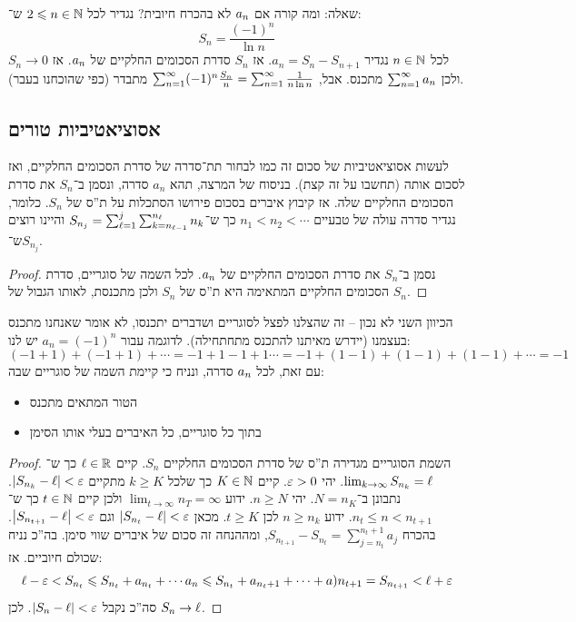 \documentclass[name=רשימות חשבון דיפרנציאלי ואינטגרלי 1א]{../../../tex/classes/megasumPreamble}
\begin{document}
	שאלה: ומה קורה אם $a_n$ לא בהכרח חיובית? נגדיר לכל $2 \leqslant n \in \mathbb{N}$ ש־:
	\[ S_n = \frac{(-1)^{n}}{\ln n} \]
	לכל $n \in \mathbb{N}$ נגדיר $a_n = S_n - S_{n + 1}$. אז $S_n$ סדרת הסכומים החלקיים של $a_n$. אז $S_n \to 0$ ולכן $\sum_{n = 1}^{\infty} a_n$ מתכנס. אבל, $\sum_{n = 1}^{\infty} (-1)^{n} \frac{S_n}{n} = \sum_{n = 1}^{\infty} \frac{1}{n \ln n}$ מתבדר (כפי שהוכחנו בעבר).
	
	\subsection{אסוציאטיביות טורים}
	לעשות אסוציאטיביות של סכום זה כמו לבחור תת־סדרה של סדרת הסכומים החלקיים, ואז לסכום אותה (תחשבו על זה קצת).
	בניסוח של המרצה, תהא $a_n$ סדרה, ונסמן ב־$S_n$ את סדרת הסכומים החלקיים שלה. אז קיבוץ איברים בסכום פירושו הסתכלות על ת''ס של $S_n$. כלומר, נגדיר סדרה עולה של טבעיים $n_1 < n_2 < \cdots$ כך ש־$S_{n_j} = \sum_{\ell = 1}^{j}\sum_{k = n_{\ell - 1}}^{n_\ell} n_k$ והיינו רוצים ש־$S_{n_j}$.

	 \begin{proof}
		נסמן ב־$S_n$ את סדרת הסכומים החלקיים של $a_n$. לכל השמה של סוגריים, סדרת הסכומים החלקיים המתאימה היא ת''ס של $S_n$ ולכן מתכנסת, לאותו הגבול של $S_n$.
	\end{proof}

	הכיוון השני לא נכון – זה שהצלנו לפצל לסוגריים ושדברים יתכנסו, לא אומר שאנחנו מתכנס בעצמנו (יידרש מאיתנו להתכנס מתחתחילה). לדוגמה עבור $a_n = (-1)^{n}$ יש לנו:
	\[ (-1 + 1) + (-1 + 1) + \cdots = -1 + 1 -1 + 1 \cdots = -1 + (1 - 1) + (1 - 1) + (1 - 1) + \cdots = -1 \]
	עם זאת, לכל $a_n$ סדרה, ונניח כי קיימת השמה של סוגריים שבה:
	\begin{itemize}
		\item הטור המתאים מתכנס
		\item בתוך כל סוגריים, כל האיברים בעלי אותו הסימן
	\end{itemize}

	\begin{proof}
		השמת הסוגריים מגדירה ת''ס של סדרת הסכומים החלקיים $S_n$. קיים $\ell \in \mathbb{R}$ כך ש־$\lim_{k \to \infty} S_{n_k} = \ell$. יהי $\eg > 0$. קיים $K \in \mathbb{N}$ כך שלכל $k \ge K$ מתקיים $\sof{S_{n_k} - \ml} < \eg$. נתבונן ב־$N = n_K$. יהי $n \ge N$. ידוע $\lim_{t \to \infty} n_T = \infty$ ולכן קיים $t \in \mathbb{N}$ כך ש־$n_t \le n < n_{t + 1}$. ידוע $n \ge n_k$ לכן $t \ge K$. מכאן $\sof{S_{n_t} - \ml} < \eg$ וגם $\sof{S_{n_{t + 1}} - \ml} < \eg$. בהכרח $S_{n_{t + 1}}  - S_{n_t} = \sum_{j = n_t}^{n_t + 1}a_j$, ומההנחה זה סכום של איברים שווי סימן. בה''כ נניח שכולם חיוביים. אז:
		\[ \ml - \eg < S_{n_t} \le S_{n_t} + a_{n_t} + \cdots a_n \le S_{n_{t}} + a_{n_t + 1} + \cdots + a){n_{t + 1}} = S_{n_{t + 1}} < \ml + \eg \]
		סה''כ נקבל $\sof{S_n - \ml} < \eg$. לכן $S_n \to \ell$.
	\end{proof}
\end{document}
